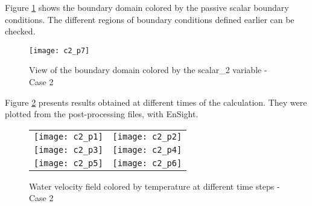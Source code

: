 Figure \ref{fige1_e2} shows the boundary domain colored by the passive
scalar boundary conditions. The different regions of boundary
conditions defined earlier can be checked.

\begin{figure}[h!]
\begin{center}
\texttt{[image: c2\_p7]}
\caption{View of the boundary domain colored by the scalar\_2 variable - Case 2}
\label{fige1_e2}
\end{center}
\end{figure}

Figure \ref{fige2_e2} presents results obtained at different times of the
calculation. They were plotted from the post-processing files, with EnSight.

\begin{figure}
\begin{center}
\begin{tabular}{cc}
\texttt{[image: c2\_p1]} &
\texttt{[image: c2\_p2]} \\
\texttt{[image: c2\_p3]} &
\texttt{[image: c2\_p4]} \\
\texttt{[image: c2\_p5]} &
\texttt{[image: c2\_p6]} \\
\end{tabular}
\caption{Water velocity field colored by temperature at different time steps - Case 2}
\label{fige2_e2}
\end{center}
\end{figure}
